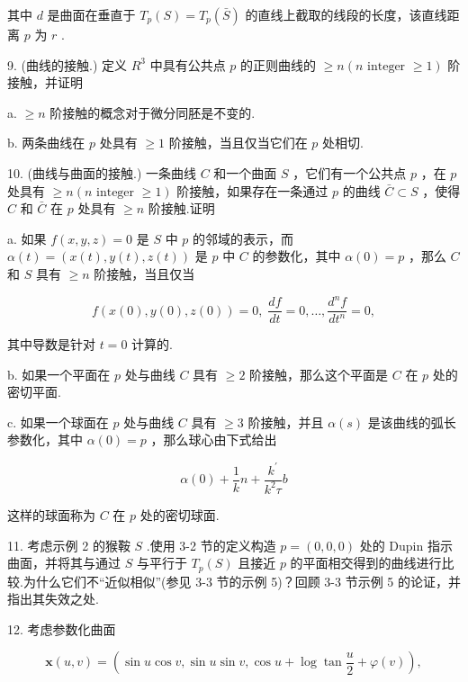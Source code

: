 其中 \(d\) 是曲面在垂直于 \({T}_{p}\left( S\right)  = {T}_{p}\left( \bar{S}\right)\) 的直线上截取的线段的长度，该直线距离 \(p\) 为 \(r\) .

9. (曲线的接触.) 定义 \({R}^{3}\) 中具有公共点 \(p\) 的正则曲线的 \(\geq  n\left( {n\text{ integer } \geq  1}\right)\) 阶接触，并证明

a. \(\geq  n\) 阶接触的概念对于微分同胚是不变的.

b. 两条曲线在 \(p\) 处具有 \(\geq  1\) 阶接触，当且仅当它们在 \(p\) 处相切.

10. (曲线与曲面的接触.) 一条曲线 \(C\) 和一个曲面 \(S\) ，它们有一个公共点 \(p\) ，在 \(p\) 处具有 \(\geq  n\left( {n\text{ integer } \geq  1}\right)\) 阶接触，如果存在一条通过 \(p\) 的曲线 \(\bar{C} \subset  S\) ，使得 \(C\) 和 \(\bar{C}\) 在 \(p\) 处具有 \(\geq  n\) 阶接触.证明

a. 如果 \(f\left( {x,y,z}\right)  = 0\) 是 \(S\) 中 \(p\) 的邻域的表示，而 \(\alpha \left( t\right)  = \left( {x\left( t\right) ,y\left( t\right) ,z\left( t\right) }\right)\) 是 \(p\) 中 \(C\) 的参数化，其中 \(\alpha \left( 0\right)  = p\) ，那么 \(C\) 和 \(S\) 具有 \(\geq  n\) 阶接触，当且仅当

\[
f\left( {x\left( 0\right) ,y\left( 0\right) ,z\left( 0\right) }\right)  = 0,\;\frac{df}{dt} = 0,\ldots ,\frac{{d}^{n}f}{d{t}^{n}} = 0,
\]

其中导数是针对 \(t = 0\) 计算的.

b. 如果一个平面在 \(p\) 处与曲线 \(C\) 具有 \(\geq  2\) 阶接触，那么这个平面是 \(C\) 在 \(p\) 处的密切平面.

c. 如果一个球面在 \(p\) 处与曲线 \(C\) 具有 \(\geq  3\) 阶接触，并且 \(\alpha \left( s\right)\) 是该曲线的弧长参数化，其中 \(\alpha \left( 0\right)  = p\) ，那么球心由下式给出

\[
\alpha \left( 0\right)  + \frac{1}{k}n + \frac{{k}^{\prime }}{{k}^{2}\tau }b
\]

这样的球面称为 \(C\) 在 \(p\) 处的密切球面.

11. 考虑示例 2 的猴鞍 \(S\) .使用 3-2 节的定义构造 \(p = \left( {0,0,0}\right)\) 处的 Dupin 指示曲面，并将其与通过 \(S\) 与平行于 \({T}_{p}\left( S\right)\) 且接近 \(p\) 的平面相交得到的曲线进行比较.为什么它们不“近似相似”(参见 3-3 节的示例 5)？回顾 3-3 节示例 5 的论证，并指出其失效之处.

12. 考虑参数化曲面

\[
\mathbf{x}\left( {u,v}\right)  = \left( {\sin u\cos v,\sin u\sin v,\cos u + \log \tan \frac{u}{2} + \varphi \left( v\right) }\right) ,
\]

